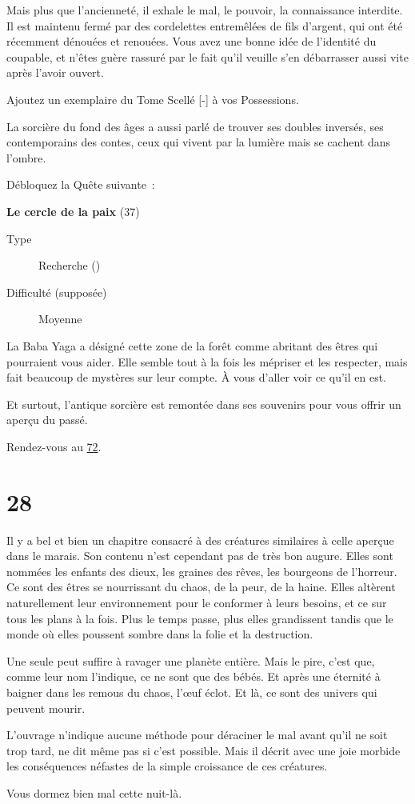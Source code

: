 \documentclass{report}
\newcommand{\gsection}[1]{
    \section{#1}
    \label{section-#1}
}
\newcommand{\glink}[1]{\hyperref[section-#1]{#1}}
\newcommand{\quest}[5]{
    \begin{mdframed}[innertopmargin=0.5cm,innerbottommargin=0.5cm,leftmargin=0.5cm,rightmargin=0.5cm]
        \begin{center}
            \textbf{#1} (#2)
        \end{center}
        \begin{description}
            \item[Type] #3
            \item[Difficulté (supposée)] #4
        \end{description}
        #5
    \end{mdframed}
}
\begin{document}
Mais plus que l'ancienneté, il exhale le mal, le pouvoir, la connaissance interdite. Il est maintenu fermé par des cordelettes entremêlées de fils d'argent, qui ont été récemment dénouées et renouées. Vous avez une bonne idée de l'identité du coupable, et n'êtes guère rassuré par le fait qu'il veuille s'en débarrasser aussi vite après l'avoir ouvert.

Ajoutez un exemplaire du Tome Scellé [-] à vos Possessions.

La sorcière du fond des âges a aussi parlé de trouver ses doubles inversés, ses contemporains des contes, ceux qui vivent par la lumière mais se cachent dans l'ombre.

Débloquez la Quête suivante :

\quest{Le cercle de la paix}{37}{Recherche (\caduceus)}{Moyenne}{
La Baba Yaga a désigné cette zone de la forêt comme abritant des êtres qui pourraient vous aider. Elle semble tout à la fois les mépriser et les respecter, mais fait beaucoup de mystères sur leur compte. À vous d'aller voir ce qu'il en est.
}

Et surtout, l'antique sorcière est remontée dans ses souvenirs pour vous offrir un aperçu du passé.

Rendez-vous au \glink{72}.

\gsection{28}

Il y a bel et bien un chapitre consacré à des créatures similaires à celle aperçue dans le marais. Son contenu n'est cependant pas de très bon augure. Elles sont nommées les enfants des dieux, les graines des rêves, les bourgeons de l'horreur. Ce sont des êtres se nourrissant du chaos, de la peur, de la haine. Elles altèrent naturellement leur environnement pour le conformer à leurs besoins, et ce sur tous les plans à la fois. Plus le temps passe, plus elles grandissent tandis que le monde où elles poussent sombre dans la folie et la destruction.

Une seule peut suffire à ravager une planète entière. Mais le pire, c'est que, comme leur nom l'indique, ce ne sont que des bébés. Et après une éternité à baigner dans les remous du chaos, l’œuf éclot. Et là, ce sont des univers qui peuvent mourir.

L'ouvrage n'indique aucune méthode pour déraciner le mal avant qu'il ne soit trop tard, ne dit même pas si c'est possible. Mais il décrit avec une joie morbide les conséquences néfastes de la simple croissance de ces créatures.

Vous dormez bien mal cette nuit-là.
\end{document}
